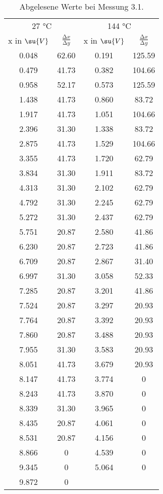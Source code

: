 \begin{table}
  \centering
  \caption{Abgelesene Werte bei Messung 3.1.}
  \label{tab:MessungA27}
  \begin{tabular}{c c |c c}
    \toprule
    \multicolumn{2}{c}{27 °C} & \multicolumn{2}{c}{144 °C} \\
    x in $\su{V}$ & $ \frac{\increment x}{\increment y}$ &
    x in $\su{V}$ & $ \frac{\increment x}{\increment y}$ \\
    \midrule
    0.048  & 62.60 & 0.191 & 125.59 \\
    0.479  & 41.73 & 0.382 & 104.66 \\
    0.958  & 52.17 & 0.573 & 125.59 \\
    1.438  & 41.73 & 0.860 &  83.72 \\
    1.917  & 41.73 & 1.051 & 104.66 \\
    2.396  & 31.30 & 1.338 &  83.72 \\
    2.875  & 41.73 & 1.529 & 104.66 \\
    3.355  & 41.73 & 1.720 &  62.79 \\
    3.834  & 31.30 & 1.911 &  83.72 \\
    4.313  & 31.30 & 2.102 &  62.79 \\
    4.792  & 31.30 & 2.245 &  62.79 \\
    5.272  & 31.30 & 2.437 &  62.79 \\
    5.751  & 20.87 & 2.580 &  41.86 \\
    6.230  & 20.87 & 2.723 &  41.86 \\
    6.709  & 20.87 & 2.867 &  31.40 \\
    6.997  & 31.30 & 3.058 &  52.33 \\
    7.285  & 20.87 & 3.201 &  41.86 \\
    7.524  & 20.87 & 3.297 &  20.93 \\
    7.764  & 20.87 & 3.392 &  20.93 \\
    7.860  & 20.87 & 3.488 &  20.93 \\
    7.955  & 31.30 & 3.583 &  20.93 \\
    8.051  & 41.73 & 3.679 &  20.93 \\
    8.147  & 41.73 & 3.774 &  0  \\
    8.243  & 41.73 & 3.870 &  0  \\
    8.339  & 31.30 & 3.965 &  0  \\
    8.435  & 20.87 & 4.061 &  0  \\
    8.531  & 20.87 & 4.156 &  0  \\
    8.866  & 0     & 4.539 &  0  \\
    9.345  & 0     & 5.064 &  0  \\
    9.872  & 0     & & \\
  \end{tabular}
\end{table}
